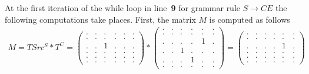 At the first iteration of the while loop in line~\textbf{9} for grammar rule $S \to C E$ the following computations take places. 
First, the matrix $M$ is computed as follows
{
    \renewcommand{\arraystretch}{0.7}
    \setlength\arraycolsep{2pt}
\begin{align*}
M=TSrc^S*T^C = 
\begin{pmatrix}
    . & . & . & . & . & . \\
    . & . & . & . & . & . \\
    . & . & 1 & . & . & . \\
    . & . & . & . & . & . \\ 
    . & . & . & . & . & . \\ 
    . & . & . & . & . & .
\end{pmatrix}*
\begin{pmatrix}
    . & . & . & . & . & . \\
    . & . & . & . & . & . \\
    . & . & . & . & 1 & . \\
    . & . & 1 & . & . & . \\ 
    . & . & . & 1 & . & . \\ 
    . & . & . & . & . & .
\end{pmatrix}= 
\begin{pmatrix}
    . & . & . & . & . & . \\
    . & . & . & . & . & . \\
    . & . & . & . & 1 & . \\
    . & . & . & . & . & . \\ 
    . & . & . & . & . & . \\ 
    . & . & . & . & . & .
\end{pmatrix}
\end{align*}
}


